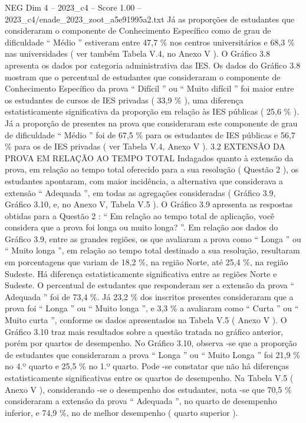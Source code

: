 \begin{textsample}{NEG Dim 4 – 2023\_c4 – Score 1.00 – 2023\_c4/enade\_2023\_zoot\_a5e91995a2.txt}
Já as proporções de estudantes que consideraram o componente de Conhecimento Específico como de grau de dificuldade “ Médio ” estiveram entre 47,7 \% nos centros universitários e 68,3 \% nas universidades ( ver também Tabela V.4, no Anexo V ).
O Gráfico 3.8 apresenta os dados por categoria administrativa das IES.
Os dados do Gráfico 3.8 mostram que o percentual de estudantes que consideraram o componente de Conhecimento Específico da prova “ Difícil ” ou “ Muito difícil ” foi maior entre os estudantes de cursos de IES privadas ( 33,9 \% ), uma diferença estatisticamente significativa da proporção em relação às IES públicas ( 25,6 \% ).
Já a proporção de presentes na prova que consideraram este componente de grau de dificuldade “ Médio ” foi de 67,5 \% para os estudantes de IES públicas e 56,7 \% para os de IES privadas ( ver Tabela V.4, Anexo V ). 3.2 EXTENSÃO DA PROVA EM RELAÇÃO AO TEMPO TOTAL Indagados quanto à extensão da prova, em relação ao tempo total oferecido para a sua resolução ( Questão 2 ), os estudantes apontaram, com maior incidência, a alternativa que considerava a extensão “ Adequada ”, em todas as agregações consideradas ( Gráfico 3.9, Gráfico 3.10, e, no Anexo V, Tabela V.5 ).
O Gráfico 3.9 apresenta as respostas obtidas para a Questão 2 : “ Em relação ao tempo total de aplicação, você considera que a prova foi longa ou muito longa? ”.
Em relação aos dados do Gráfico 3.9, entre as grandes regiões, os que avaliaram a prova como “ Longa ” ou “ Muito longa ”, em relação ao tempo total destinado a sua resolução, resultaram em porcentagens que variam de 18,2 \%, na região Norte, até 25,4 \%, na região Sudeste.
Há diferença estatisticamente significativa entre as regiões Norte e Sudeste.
O percentual de estudantes que responderam ser a extensão da prova “ Adequada ” foi de 73,4 \%.
Já 23,2 \% dos inscritos presentes consideraram que a prova foi “ Longa ” ou “ Muito longa ”, e 3,3 \% a avaliaram como “ Curta ” ou “ Muito curta ”, conforme os dados apresentados na Tabela V.5 ( Anexo V ).
O Gráfico 3.10 traz mais resultados sobre a questão tratada no gráfico anterior, porém por quartos de desempenho.
No Gráfico 3.10, observa -se que a proporção de estudantes que consideraram a prova “ Longa ” ou “ Muito Longa ” foi 21,9 \% no 4.º quarto e 25,5 \% no 1.º quarto.
Pode -se constatar que não há diferenças estatisticamente significativas entre os quartos de desempenho.
Na Tabela V.5 ( Anexo V ), considerando -se o desempenho dos estudantes, nota -se que 70,5 \% consideraram a extensão da prova “ Adequada ”, no quarto de desempenho inferior, e 74,9 \%, no de melhor desempenho ( quarto superior ).

\end{textsample}
